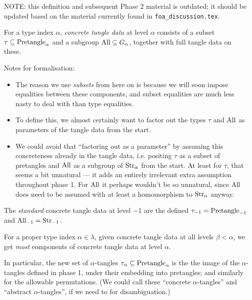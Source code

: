 \begin{definition}
  \label{def:concrete-tangle-data}
  NOTE: this definition and subsequent Phase 2 material is outdated; it should be updated based on the material currently found in \verb|foa_discussion.tex|.

  For a type index $\alpha$, \emph{concrete tangle data} at level $\alpha$ consists of a subset $\tau \subseteq \mathrm{Pretangle}_\alpha$ and a subgroup $\mathrm{All} \subseteq G_\alpha$, together with full tangle data on these.

  Notes for formalisation:
  \begin{itemize}
    \item The reason we use \emph{subsets} from here on is because we will soon impose equalities between these components, and subset equalities are much less nasty to deal with than type equalities.
    \item To define this, we almost certainly want to factor out the types $\tau$ and $\mathrm{All}$ as parameters of the tangle data from the start.
    \item We could avoid that “factoring out as a parameter” by assuming this concreteness already in the tangle data, i.e. positing $\tau$ as a subset of pretangles and $\mathrm{All}$ as a subgroup of $\mathrm{Str}_\alpha$ from the start.  At least for $\tau$, that seems a bit unnatural — it adds an entirely irrelevant extra assumption throughout phase 1.  For $\mathrm{All}$ it perhaps wouldn’t be so unnatural, since $\mathrm{All}$ does need to be assumed with at least a homomorphism to $\mathrm{Str}_\alpha$ anyway.
  \end{itemize}

  The \emph{standard} concrete tangle data at level $-1$ are the defined $\tau_{-1} = \mathrm{Pretangle}_{-1}$ and $\mathrm{All}_{-1} = \mathrm{Str}_{-1}$.
\end{definition}

\begin{definition}
  \label{def:concrete-tangle-data-propagates}
  For a proper type index $\alpha \in \lambda$, given concrete tangle data at all levels $\beta < \alpha$, we get \emph{most} components of concrete tangle data at level $\alpha$.

  In particular, the new set of $\alpha$-tangles $\tau_\alpha \subseteq \mathrm{Pretangle}_\alpha$ is the the image of the $\alpha$-tangles defined in phase 1, under their embedding into pretangles; and similarly for the allowable permutations.  (We could call these “concrete $\alpha$-tangles” and “abstract $\alpha$-tangles”, if we need to for disambiguation.)
\end{definition}

